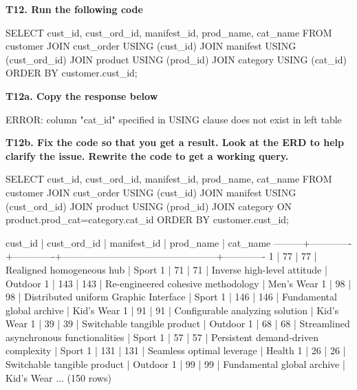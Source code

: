 \textbf{T12. Run the following code}
\begin{sql}
SELECT cust_id,
   	cust_ord_id,
   	manifest_id,
   	prod_name,
   	cat_name
FROM customer
JOIN cust_order USING (cust_id)
JOIN manifest USING (cust_ord_id)
JOIN product USING (prod_id)
JOIN category USING (cat_id)
ORDER BY customer.cust_id;
\end{sql}
\textbf{T12a. Copy the response below}
\begin{pseudo*}
ERROR:  column "cat_id" specified in USING clause does not exist in left table
\end{pseudo*}
\textbf{T12b. Fix the code so that you get a result. Look at the ERD to help clarify the issue. Rewrite the code to get a working query.}
\begin{sql}
SELECT cust_id,
   	cust_ord_id,
   	manifest_id,
   	prod_name,
   	cat_name
FROM customer
JOIN cust_order USING (cust_id)
JOIN manifest USING (cust_ord_id)
JOIN product USING (prod_id)
JOIN category ON product.prod_cat=category.cat_id
ORDER BY customer.cust_id;
\end{sql}
\begin{pseudo}
 cust_id | cust_ord_id | manifest_id |                   prod_name                    |  cat_name
---------+-------------+-------------+------------------------------------------------+-------------
       1 |          77 |          77 | Realigned homogeneous hub                      | Sport
       1 |          71 |          71 | Inverse high-level attitude                    | Outdoor
       1 |         143 |         143 | Re-engineered cohesive methodology             | Men's Wear
       1 |          98 |          98 | Distributed uniform Graphic Interface          | Sport
       1 |         146 |         146 | Fundamental global archive                     | Kid's Wear
       1 |          91 |          91 | Configurable analyzing solution                | Kid's Wear
       1 |          39 |          39 | Switchable tangible product                    | Outdoor
       1 |          68 |          68 | Streamlined asynchronous functionalities       | Sport
       1 |          57 |          57 | Persistent demand-driven complexity            | Sport
       1 |         131 |         131 | Seamless optimal leverage                      | Health
       1 |          26 |          26 | Switchable tangible product                    | Outdoor
       1 |          99 |          99 | Fundamental global archive                     | Kid's Wear
...
(150 rows)
\end{pseudo}